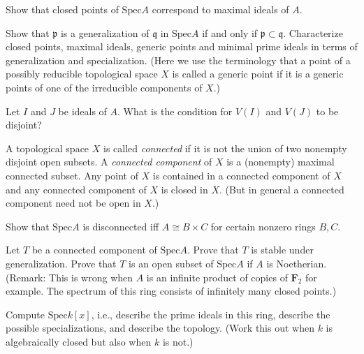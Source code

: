\begin{exercise}
Show that closed points of $\text{Spec} A$ 
correspond to maximal ideals of $A$.
\end{exercise}

\begin{exercise}
Show that ${\mathfrak p}$ is a generalization of ${\mathfrak q}$ 
in $\text{Spec} A$ if and only if ${\mathfrak p}\subset {\mathfrak q}$. Characterize closed points,
maximal ideals, generic points and minimal prime ideals in terms of
generalization and specialization. (Here we use the terminology that a point
of a possibly reducible topological space $X$ is called a generic point
if it is a generic points of one of the irreducible components of $X$.)
\end{exercise}

\begin{exercise}
Let $I$ and $J$ be ideals of $A$.
What is the condition for $V(I)$ and $V(J)$ to be disjoint?
\end{exercise}

\begin{definition}
A topological space $X$ is called {\it connected} if it is not the union
of two nonempty disjoint open subsets. A {\it connected component}
of $X$ is a (nonempty) maximal connected subset. Any point of $X$ is contained
in a connected component of $X$ and any connected component of $X$ is
closed in $X$. (But in general a connected component need not be open in $X$.)
\end{definition}

\begin{exercise}
Show that $\text{Spec} A$ is disconnected
iff $A\cong B\times C$ for certain nonzero rings $B,C$.
\end{exercise}

\begin{exercise}
Let $T$ be a connected component
of $\text{Spec} A$. Prove that $T$ is stable under generalization.
Prove that $T$ is an open subset of $\text{Spec} A$ if $A$ is Noetherian.
(Remark: This is wrong when $A$ is an infinite product of copies of
${\mathbf F}_2$ for example. The spectrum of this ring consists of infinitely
many closed points.)
\end{exercise}

\begin{exercise}
Compute $\text{Spec} k[x]$, i.e., describe
the prime ideals in this ring, describe the possible specializations, and
describe the topology. (Work this out when $k$ is algebraically closed but
also when $k$ is not.)
\end{exercise}

